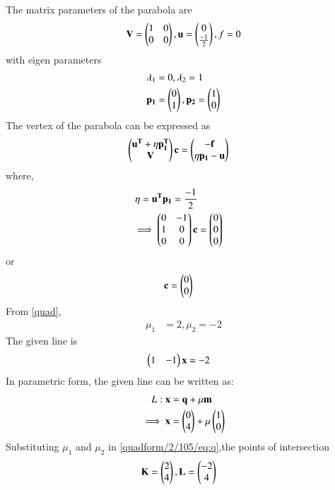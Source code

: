 \documentclass[journal,12pt,twocolumn]{IEEEtran}
\begin{document}
 The matrix parameters of the parabola are
\begin{align}
\mathbf{V}=\begin{pmatrix}1&0\\0&0\end{pmatrix},\mathbf{u}=\begin{pmatrix}0\\ \frac{-1}{2}\end{pmatrix},f=0 \label{quadform/2/105/eq:v}
\end{align}
with eigen parameters 
\begin{align}
\lambda_1 &= 0 , \lambda_2 = 1
\\
\mathbf{p_1} &= \begin{pmatrix}0 \\ 1\end{pmatrix},
\mathbf{p_2} = \begin{pmatrix}1 \\ 0\end{pmatrix}
\end{align}
The vertex of the parabola can be expressed as
\begin{align} \begin{pmatrix}\mathbf{u^T}+\eta\mathbf{p_1^T}\\\mathbf{V} \end{pmatrix}\mathbf{c} &= \begin{pmatrix}\mathbf{-f}\\\eta \mathbf{p_1} -\mathbf{u}\end{pmatrix}
\end{align}
where, 
\begin{align}\eta = \mathbf{u^T}\mathbf{p_1} = \frac{-1}{2}
\\
\implies\begin{pmatrix}0 & -1\\1 & 0 \\0 & 0\end{pmatrix} \mathbf{c}&= \begin{pmatrix}0\\0\\0\end{pmatrix}
\end{align}
or
\begin{align}
   \mathbf{c} &= \begin{pmatrix}0 \\ 0\end{pmatrix}
\end{align}
From  \eqref{quad},
\begin{align}
\mu_{1} &= 2, \mu_{2} =-2
\end{align}
The given line is
\begin{align} 
\begin{pmatrix}1&-1\end{pmatrix}\mathbf{x}&=-2
\end{align}
 In parametric form, the given  line can be written as:
\begin{align} 
L: \mathbf{x}&=\mathbf{q}+\mu\mathbf{m}
\\
\implies \mathbf{x}&=\begin{pmatrix}0\\4\end{pmatrix}+\mu\begin{pmatrix}1\\0\end{pmatrix} \label{quadform/2/105/eq:q}
\end{align}
Substituting $\mu_1$ and $\mu_2$ in \eqref{quadform/2/105/eq:q},the points of intersection
\begin{align}
 \mathbf{K}= \begin{pmatrix}2\\4\end{pmatrix},  
\mathbf{L}&= \begin{pmatrix}-2\\4\end{pmatrix}
\end{align}
\end{document}
